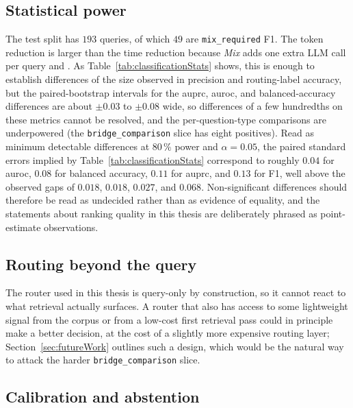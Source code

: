 \documentclass[english, bibtex]{kththesis}               %
\numberwithin{listing}{chapter}
\providecommand{\DIFaddtex}[1]{{\protect\color{blue} \sf #1}} %
\providecommand{\DIFdeltex}[1]{{\protect\color{red} \scriptsize #1}} %
\providecommand{\DIFaddbegin}{} %
\providecommand{\DIFaddend}{} %
\providecommand{\DIFdelbegin}{} %
\providecommand{\DIFdelend}{} %
\providecommand{\DIFadd}[1]{\texorpdfstring{\DIFaddtex{#1}}{#1}} %
\providecommand{\DIFdel}[1]{\texorpdfstring{\DIFdeltex{#1}}{}} %
\begin{document}
\subsection{Statistical power}
\label{sec:limitStatisticalPower}

\DIFadd{The test split has $193$ queries, of which $49$ are }\DIFaddend \texttt{mix\_required}\DIFdelbegin \DIFdel{F1. The token reduction is larger than the time reduction because \emph{Mix} adds one extra LLM call per query and }\DIFdelend \DIFaddbegin \DIFadd{. As Table~\ref{tab:classificationStats} shows, this is enough to establish differences of the size observed in precision and routing-label accuracy, but the paired-bootstrap intervals for the \gls{auprc}, \gls{auroc}, and balanced-accuracy differences are about $\pm 0.03$ to $\pm 0.08$ wide, so differences of a few hundredths on these metrics cannot be resolved, and the per-question-type comparisons are underpowered (the \texttt{bridge\_comparison} slice has eight positives). Read as minimum detectable differences at $80\,\%$ power and $\alpha = 0.05$, the paired standard errors implied by Table~\ref{tab:classificationStats} correspond to roughly $0.04$ for \gls{auroc}, $0.08$ for balanced accuracy, $0.11$ for \gls{auprc}, and $0.13$ for F1, well above the observed gaps of $0.018$, $0.018$, $0.027$, and $0.068$. Non-significant differences should therefore be read as undecided rather than as evidence of equality, and the statements about ranking quality in this thesis are deliberately phrased as point-estimate observations.
}

\subsection{Routing beyond the query}
\label{sec:limitRouting}

\DIFadd{The router used in this thesis is query-only by construction, so it cannot react to what retrieval actually surfaces. A router that also has access to some lightweight signal from the corpus or from a low-cost first retrieval pass could in principle make a better decision, at the cost of a slightly more expensive routing layer; Section~\ref{sec:futureWork} outlines such a design, which would be the natural way to attack the harder \texttt{bridge\_comparison} slice.
}

\subsection{Calibration and abstention}
\label{sec:limitCalibration}
\end{document}
